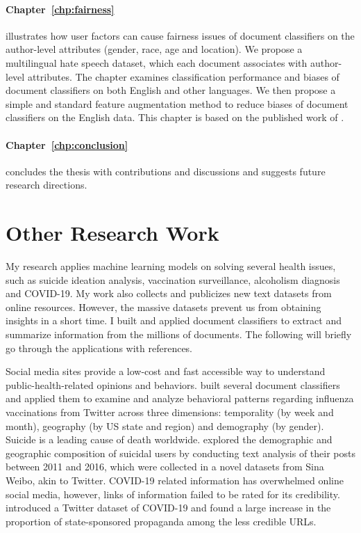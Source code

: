 \paragraph{Chapter~\ref{chp:fairness}} illustrates how user factors can cause fairness issues of document classifiers on the author-level attributes (gender, race, age and location). We propose a multilingual hate speech dataset, which each document associates with author-level attributes. The chapter examines classification performance and biases of document classifiers on both English and other languages. We then propose a simple and standard feature augmentation method to reduce biases of document classifiers on the English data. 
This chapter is based on the published work of \cite{huang2020multilingual}.

\paragraph{Chapter~\ref{chp:conclusion}} concludes the thesis with contributions and discussions and suggests future research directions.

\section{Other Research Work}

My research applies machine learning models on solving several health issues, such as suicide ideation analysis, vaccination surveillance, alcoholism diagnosis and COVID-19. 
My work also collects and publicizes new text datasets from online resources. 
However, the massive datasets prevent us from obtaining insights in a short time.
I built and applied document classifiers to extract and summarize information from the millions of documents. 
The following will briefly go through the applications with references.

Social media sites provide a low-cost and fast accessible way to understand public-health-related opinions and behaviors. \cite{huang2017examining, huang2019can} built several document classifiers and applied them to examine and analyze behavioral patterns regarding influenza vaccinations from Twitter across three dimensions: temporality (by week and month), geography (by US state and region) and demography (by gender).
Suicide is a leading cause of death worldwide. \cite{huang2017exploring} explored the demographic and geographic composition of suicidal users by conducting text analysis of their posts between 2011 and 2016, which were collected in a novel datasets from Sina Weibo, akin to Twitter.
COVID-19 related information has overwhelmed online social media, however, links of information failed to be rated for its credibility. \cite{broniatowski2020covid, huang2020coronavirus} introduced a Twitter dataset of COVID-19 and found a large increase in the proportion of state-sponsored propaganda among the less credible URLs.


